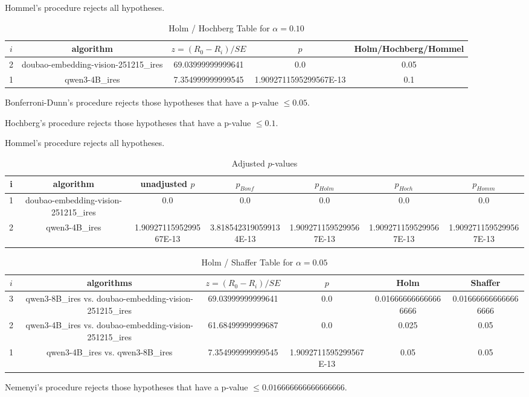 \documentclass[a4paper,10pt]{article}
\begin{document}
\begin{landscape}
Hommel's procedure rejects all hypotheses.


\begin{table}[!htp]
\centering\tiny
\caption{Holm / Hochberg Table for $\alpha=0.10$}
\begin{tabular}{ccccc}
$i$&algorithm&$z=(R_0 - R_i)/SE$&$p$&Holm/Hochberg/Hommel\\
\hline
2&doubao-embedding-vision-251215_ires&69.03999999999641&0.0&0.05\\
1&qwen3-4B_ires&7.354999999999545&1.9092711595299567E-13&0.1\\
\hline
\end{tabular}
\end{table}
Bonferroni-Dunn's procedure rejects those hypotheses that have a p-value $\le0.05$.


Hochberg's procedure rejects those hypotheses that have a p-value $\le0.1$.


Hommel's procedure rejects all hypotheses.


\begin{table}[!htp]
\centering\tiny
\caption{Adjusted $p$-values}
\begin{tabular}{ccccccc}
i&algorithm&unadjusted $p$&$p_{Bonf}$&$p_{Holm}$&$p_{Hoch}$&$p_{Homm}$\\
\hline
1&doubao-embedding-vision-251215_ires&0.0&0.0&0.0&0.0&0.0\\
2&qwen3-4B_ires&1.9092711595299567E-13&3.8185423190599134E-13&1.9092711595299567E-13&1.9092711595299567E-13&1.9092711595299567E-13\\
\hline
\end{tabular}
\end{table}

\begin{table}[!htp]
\centering\tiny
\caption{Holm / Shaffer Table for $\alpha=0.05$}
\begin{tabular}{cccccc}
$i$&algorithms&$z=(R_0 - R_i)/SE$&$p$&Holm&Shaffer\\
\hline
3&qwen3-8B_ires vs. doubao-embedding-vision-251215_ires&69.03999999999641&0.0&0.016666666666666666&0.016666666666666666\\2&qwen3-4B_ires vs. doubao-embedding-vision-251215_ires&61.68499999999687&0.0&0.025&0.05\\1&qwen3-4B_ires vs. qwen3-8B_ires&7.354999999999545&1.9092711595299567E-13&0.05&0.05\\\hline
\end{tabular}
\end{table}
Nemenyi's procedure rejects those hypotheses that have a p-value $\le0.016666666666666666$.



\end{landscape}
\end{document}

